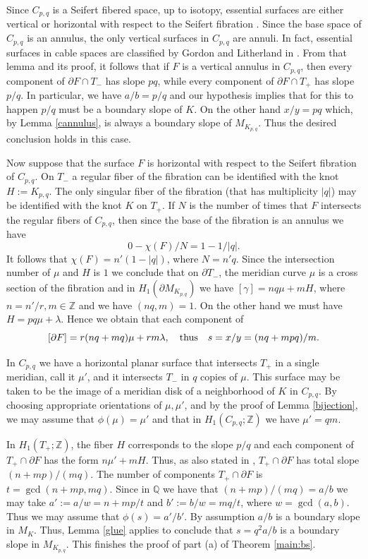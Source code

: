\documentclass[11pt]{amsart}
\theoremstyle{definition}
\newcommand{\ZZ}{{\mathbb{Z}}}
\newcommand{\QQ}{{\mathbb{Q}}}
\newcommand{\M}{M_{K_{p,q}}}
\newcommand{\C}{{C_{p, q}}}
\newcommand{\K}{{K_{p, q}}}
\newcommand{\abs}[1]{{\left\vert #1 \right\vert}}
\begin{document}
Since $\C$ is a Seifert fibered space, up to isotopy,  essential surfaces are either vertical or horizontal with respect to the Seifert fibration \cite{Ha}. Since the base space of $\C$ is an annulus, the only vertical surfaces in $\C$ are annuli.
In fact, essential surfaces in cable spaces are classified by Gordon and Litherland in \cite[Lemma 3.1]{GL}. From that lemma and its proof, it follows that if $F$ is a vertical annulus in $\C$, then every component of $\partial F\cap T_{-}$  has slope $pq$, while every component of 
$\partial F\cap T_{+}$ has slope $p/q$.  In particular, we have $a/b=p/q$ and our hypothesis 
implies that for this to happen  $p/q$ must be a boundary slope of $K$. On the other hand $x/y=pq$ which, by Lemma \ref{cannulus},
is always a boundary slope of $\M$. Thus the desired conclusion holds in this case.



Now suppose that the surface $F$ is horizontal with respect to the Seifert fibration of $\C$.
On $T_{-}$ a regular fiber of the fibration can be identified with the knot $H:=\K$.
The only singular fiber of the fibration  (that has multiplicity $\abs{q}$) may be identified with the knot $K$ on $T_{+}$. If $N$ is the number of times that $F$ intersects the regular fibers of $\C$, then since the base of the fibration is an annulus we have
$$0-\chi(F)/N= 1-1/\abs{q}.$$
It follows that  $\chi(F)=n' (1-\abs{q})$, where
 $N=n'q$. 
Since the intersection number of $\mu$ and $H$ is $1$ we conclude that on $\partial T_{-}$,  the meridian curve $\mu$ is a cross section of the fibration and in $H_1(\partial \M)$ we have
$[\gamma]=nq  \mu +mH$, where  $n=n'/r, m\in \ZZ$ and we have $(nq, m)=1$.
On the other hand we must have  $H= pq \mu + \lambda$.
Hence we obtain that each component of   $$[\partial F]=r(nq +mq) \mu +rm\lambda, \ \ \  {\rm thus} \ \ \  s=x/y= (nq +mpq)/m.$$

In $\C$ we have a horizontal planar surface that intersects $T_{+}$ in a single meridian, call it $\mu'$,  and it intersects
$T_{-}$ in $q$ copies of $\mu$. This surface may be taken to be the image of a meridian disk of a neighborhood of $K$ in $\C$.
By choosing appropriate orientations of $\mu, \mu'$, and by the proof of Lemma \ref{bijection},  we may assume that $\phi(\mu)=\mu'$ and that in $H_1(\C ; \ZZ)$ we have $\mu'=q m$.


In $H_1(T_{+}; \ZZ)$,  the fiber $H$ corresponds to the slope $p/q$
and each component of  $T_{+}\cap \partial F$ has the form
$n  \mu' + mH$. Thus,  
as also stated in \cite[Lemma 3.1]{GL}, $T_{+}\cap \partial F$ 
 has total slope $(n+mp)/(mq)$. The number of components
$T_{+}\cap \partial F$ is $t= \gcd(n+mp, mq)$. Since in $\QQ$ we have that 
 $(n+mp)/(mq)=a/b$ we may take $a':=a/w=n+mp/t$ and $b':=b/w=mq/t$, where $w=\gcd(a, b)$.
Thus we may assume that  $\phi(s)=a'/b'$. 
By assumption $a/b$  is a boundary slope in $M_K$. Thus, Lemma \ref{glue} applies
to conclude that $s=q^2a/b$ is a boundary slope in $\M$. This finishes the proof of part (a) of
 Theorem \ref{main:bs}.
 
\end{document}
